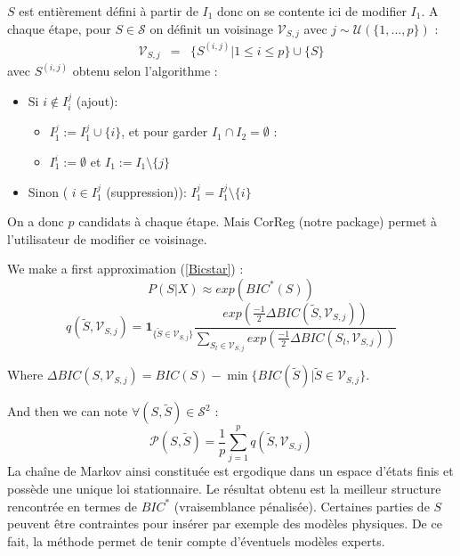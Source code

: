 \documentclass[12pt]{article}
\begin{document}
	$S$ est entièrement défini à partir de $I_1$ donc on se contente ici de modifier $I_1$. %
	A chaque étape, pour $S \in \mathcal{S}$ on définit un voisinage $\mathcal{V}_{S,j}$ avec $j \sim \mathcal{U}(\{1,\dots,p\}) $ :%
	\begin{eqnarray}
		\mathcal{V}_{S,j}&=&\{ S^{(i,j)} | 1\leq i\leq p \} \cup\{S \}
	\end{eqnarray}	
	avec $S^{(i,j)}$ obtenu selon l'algorithme :
	\begin{itemize}
		\item Si $i \notin I_i^j$ (ajout): 
			\begin{itemize}
				\item $I_1^j :=I_1^j\cup \{i\}$, et pour garder $I_1\cap I_2=\emptyset$ :
				\item $I_1^i :=\emptyset$ et $I_1:=I_1 \setminus \{j\}$
			\end{itemize}			 
		\item Sinon ( $i \in I_1^j$ (suppression)): $I_1^j=I_1^j\setminus \{i\}$
	\end{itemize}
	
	On a donc $p$ candidats à chaque étape. Mais CorReg (notre package) permet à l'utilisateur de modifier ce voisinage.
	
		
	We make a first approximation (\ref{Bicstar}) : 
	\begin{equation}
		P(S|X)\approx exp(BIC^*(S))
	\end{equation}
	\begin{equation}
		q(\tilde{S},\mathcal{V}_{S,j})=\mathbf{1}_{ \{\tilde{S}\in \mathcal{V}_{S,j}\} }\frac{exp(\frac{-1}{2}\Delta BIC(\tilde{S},\mathcal{V}_{S,j}))}{\sum_{S_l\in \mathcal{V}_{S,j}}exp(\frac{-1}{2}\Delta BIC(S_l,\mathcal{V}_{S,j}))}
	\end{equation}
	
	Where $\Delta BIC(S,\mathcal{V}_{S,j})=BIC(S)-\min\{BIC(\tilde{S})| \tilde{S} \in \mathcal{V}_{S,j} \} $.
	\newline
	
	 And then we can note $\forall (S,\tilde{S}) \in \mathcal{S}^2 $ :
		\begin{displaymath}
			\mathcal{P}(S,\tilde{S})= \frac{1}{p} \sum_{j=1}^p q(\tilde{S},\mathcal{V}_{S,j})
		\end{displaymath}
		La chaîne de Markov ainsi constituée est ergodique dans un espace d'états finis et possède une unique loi stationnaire.
		Le résultat obtenu est la meilleur structure rencontrée en termes de $BIC^*$ (vraisemblance pénalisée). Certaines parties de $S$ peuvent être contraintes pour insérer par exemple des modèles physiques. De ce fait, la méthode permet de tenir compte d'éventuels modèles experts.
\end{document}
